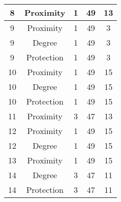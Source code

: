 \documentclass[results.tex]{subfiles}
\begin{document}
\begin{center}
\begin{tabular}{| c || c | c | c | c |}
            \hline
            8                       & Proximity                    & 1                      & 49                      & 13                   \\
            \hline
            9                       & Proximity                    & 1                      & 49                      & 3                    \\
            \hline
            9                       & Degree                       & 1                      & 49                      & 3                    \\
            \hline
            9                       & Protection                   & 1                      & 49                      & 3                    \\
            \hline
            10                      & Proximity                    & 1                      & 49                      & 15                   \\
            \hline
            10                      & Degree                       & 1                      & 49                      & 15                   \\
            \hline
            10                      & Protection                   & 1                      & 49                      & 15                   \\
            \hline
            11                      & Proximity                    & 3                      & 47                      & 13                   \\
            \hline
            12                      & Proximity                    & 1                      & 49                      & 15                   \\
            \hline
            12                      & Degree                       & 1                      & 49                      & 15                   \\
            \hline
            13                      & Proximity                    & 1                      & 49                      & 15                   \\
            \hline
            14                      & Degree                       & 3                      & 47                      & 11                   \\
            \hline
            14                      & Protection                   & 3                      & 47                      & 11                   \\

\end{tabular}
\end{center}
\end{document}
